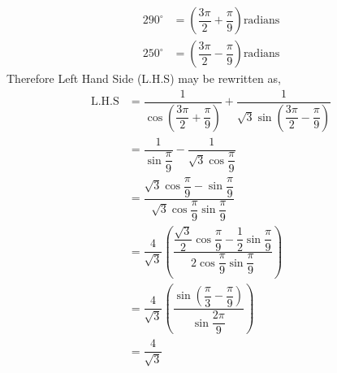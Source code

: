 \begin{solution}[\fullpage]
  \begin{align}     
    290^\circ &= \left(\dfrac{3\pi}{2}+\dfrac{\pi}{9}\right) 
      \text{radians} \\
    250^\circ &= \left(\dfrac{3\pi}{2}-\dfrac{\pi}{9}\right) 
      \text{radians}
  \end{align}
  Therefore Left Hand Side (L.H.S) may be rewritten as,
  \begin{align}
    \text{L.H.S} &= \dfrac{1}{\cos(\dfrac{3\pi}{2}+\dfrac{\pi}{9})}+
      				  \dfrac{1}{\sqrt{3}
      				    \sin(\dfrac{3\pi}{2}-\dfrac{\pi}{9})} \\
      		     &= \dfrac{1}{\sin\dfrac{\pi}{9}}-
      				  \dfrac{1}{\sqrt{3}\cos\dfrac{\pi}{9}} \\
      		     &= \dfrac{\sqrt{3}\cos\dfrac{\pi}{9}-\sin\dfrac{\pi}{9}}
      		              {\sqrt{3}\cos\dfrac{\pi}{9}\sin\dfrac{\pi}{9}} \\
      		     &= \dfrac{4}{\sqrt{3}}\left(
      		          \dfrac{\dfrac{\sqrt{3}}{2}\cos\dfrac{\pi}{9}-
      		                         \dfrac{1}{2}\sin\dfrac{\pi}{9}}
            		               {2\cos\dfrac{\pi}{9}
            		                 \sin\dfrac{\pi}{9}}\right) \\
      		     &= \dfrac{4}{\sqrt{3}}\left(
      		          \dfrac{\sin(\dfrac{\pi}{3}-\dfrac{\pi}{9})}
      		                {\sin\dfrac{2\pi}{9}}\right) \\
      		     &= \dfrac{4}{\sqrt{3}}
  \end{align}
\end{solution}
